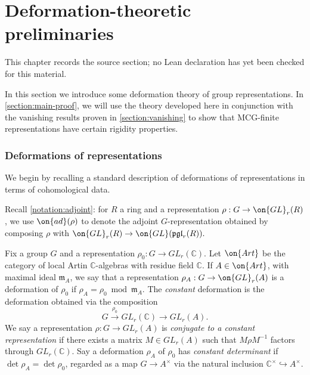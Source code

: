 \chapter{Deformation-theoretic preliminaries}
\label{canonical-representations-surface-groups-chapter-03}

\begin{remark}
\label{canonical-representations-surface-groups-chapter-03-source}
This chapter records the source section; no Lean declaration has yet been checked for this material.
\notready
\end{remark}

\label{section:deformation-theory}
In this section we introduce some deformation theory of group representations. In \autoref{section:main-proof}, we will use the theory developed here in conjunction with the vanishing results proven in \autoref{section:vanishing} to show that MCG-finite representations have certain rigidity properties.
\subsection{Deformations of representations}\label{subsection:deformation-basics}
We begin by recalling a standard description of deformations of representations in terms of cohomological data.

Recall
\autoref{notation:adjoint}:
for $R$ a ring and a representation $\rho: G\to \on{GL}_r(R)$, we use $\on{ad}(\rho)$
to denote the adjoint $G$-representation obtained by composing $\rho$ with
$\on{GL}_r(R)\to \on{GL}(\mathfrak{pgl}_r(R)).$

Fix a group $G$ and a representation $\rho_0: G\to GL_r(\mathbb{C})$. Let $\on{Art}$ be the category of local Artin $\mathbb{C}$-algebras with residue field $\mathbb{C}$. If $A\in\on{Art}$, with
maximal ideal $\mathfrak{m}_A$, we say that a representation $\rho_A: G\to
\on{GL}_r(A)$ is a deformation of $\rho_0$ if $\rho_A=\rho_0 \bmod \mathfrak{m}_A$. The \emph{constant} deformation is the deformation obtained via the composition $$G\overset{\rho_0}{\to}GL_r(\mathbb{C})\to GL_r(A).$$ We say a representation $\rho: G\to GL_r(A)$ is \emph{conjugate to a constant representation} if there exists a matrix $M\in GL_r(A)$ such that $M\rho M^{-1}$ factors through $GL_r(\mathbb{C})$.
Say a deformation $\rho_A$ of $\rho_0$ has \emph{constant determinant} if $\det\rho_A=\det\rho_0$, regarded as a map $G\to A^\times$ via the natural inclusion $\mathbb{C}^\times\hookrightarrow A^\times$.

